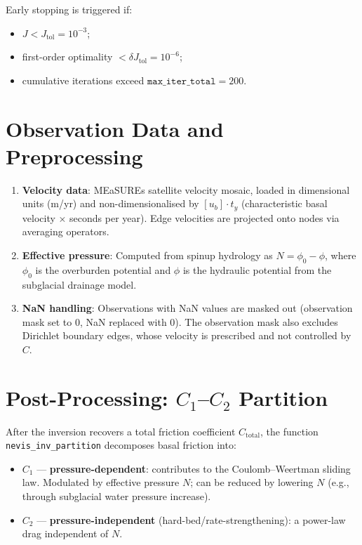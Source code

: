 \documentclass[a4paper,11pt,fleqn]{article}
\begin{document}
Early stopping is triggered if:
\begin{itemize}
    \item $J < J_{\mathrm{tol}} = 10^{-3}$;
    \item first-order optimality $< \delta J_{\mathrm{tol}} = 10^{-6}$;
    \item cumulative iterations exceed $\texttt{max\_iter\_total} = 200$.
\end{itemize}

\section{Observation Data and Preprocessing}
\label{sec:data}

\begin{enumerate}
    \item \textbf{Velocity data}: MEaSUREs satellite velocity mosaic, loaded in dimensional units (m/yr) and non-dimensionalised by $[u_b] \cdot t_y$ (characteristic basal velocity $\times$ seconds per year). Edge velocities are projected onto nodes via averaging operators.
    
    \item \textbf{Effective pressure}: Computed from spinup hydrology as $N = \phi_0 - \phi$, where $\phi_0$ is the overburden potential and $\phi$ is the hydraulic potential from the subglacial drainage model.
    
    \item \textbf{NaN handling}: Observations with NaN values are masked out (observation mask set to 0, NaN replaced with 0). The observation mask also excludes Dirichlet boundary edges, whose velocity is prescribed and not controlled by $C$.
\end{enumerate}

\section{Post-Processing: $C_1$--$C_2$ Partition}
\label{sec:partition}

After the inversion recovers a total friction coefficient $C_{\mathrm{total}}$, the function \texttt{nevis\_inv\_partition} decomposes basal friction into:
\begin{itemize}
    \item $C_1$ --- \textbf{pressure-dependent}: contributes to the Coulomb--Weertman sliding law. Modulated by effective pressure $N$; can be reduced by lowering $N$ (e.g., through subglacial water pressure increase).
    \item $C_2$ --- \textbf{pressure-independent} (hard-bed/rate-strengthening): a power-law drag independent of $N$.
\end{itemize}
\end{document}
